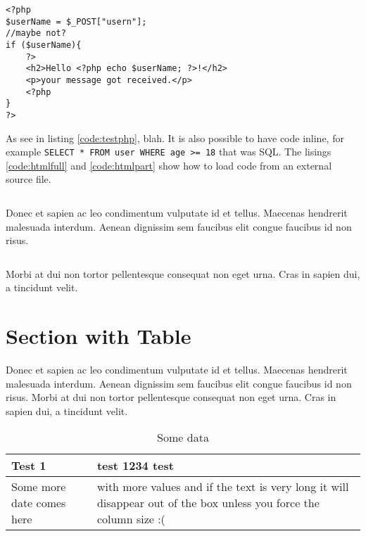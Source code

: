 \begin{code}
  \begin{verbatim}
<?php
$userName = $_POST["usern"];
//maybe not?
if ($userName){
	?>
	<h2>Hello <?php echo $userName; ?>!</h2>
	<p>your message got received.</p>
	<?php
}
?>
\end{verbatim}
  \label{code:testphp}
\end{code}


As see in listing \ref{code:testphp}, blah. It is also possible to have code inline, for example \texttt{SELECT * FROM user WHERE age >= 18} that was SQL. 
The lisings \ref{code:htmlfull} and \ref{code:htmlpart} show how to load code from an external source file.

\begin{code}
  \inputminted{html}{html5_sample.html}
  \label{code:htmlfull}
\end{code}
 Donec et sapien ac leo condimentum vulputate id et tellus. Maecenas hendrerit malesuada interdum. Aenean dignissim sem faucibus elit congue faucibus id non risus.
 
 \begin{code}
   \inputminted[firstline=3,lastline=6]{html}{html5_sample.html}
  \label{code:htmlpart}
\end{code}


 Morbi at dui non tortor pellentesque consequat non eget urna. Cras in sapien dui, a tincidunt velit.


\section{Section with Table}
Donec et sapien ac leo condimentum vulputate id et tellus. Maecenas hendrerit malesuada interdum. Aenean dignissim sem faucibus elit congue faucibus id non risus. Morbi at dui non tortor pellentesque consequat non eget urna. Cras in sapien dui, a tincidunt velit.

\begin{table}[h]
  \centering
  \caption{Some data}
  \begin{tabular}{| l | >{\centering\arraybackslash}p{} |}
    \hline
    Test 1 & test 1234 test \\
    \hline
    Some more date comes here & with more values and if the text is very long it will disappear out of the box unless you force the column size :( \\
    \hline
  \end{tabular}
  \label{table:some_data}
\end{table}


